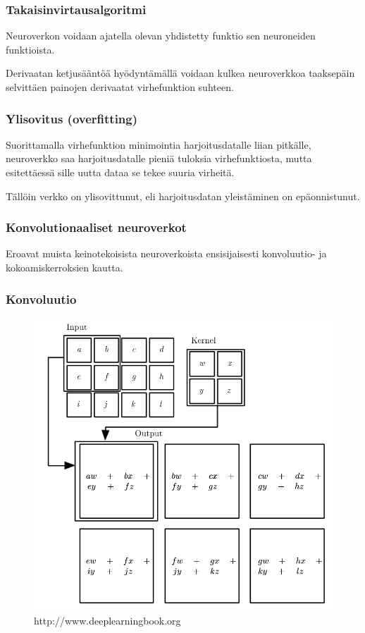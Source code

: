 \documentclass{beamer}
\begin{document}
\begin{frame}
    \frametitle{Takaisinvirtausalgoritmi}
    Neuroverkon voidaan ajatella olevan yhdistetty funktio sen neuroneiden funktioista.

    Derivaatan ketjusääntöä hyödyntämällä voidaan kulkea neuroverkkoa taaksepäin selvittäen
    painojen derivaatat virhefunktion suhteen.
\end{frame}

\begin{frame}
    \frametitle{Ylisovitus (overfitting)}
    Suorittamalla virhefunktion minimointia harjoitusdatalle liian pitkälle,
    neuroverkko saa harjoitusdatalle pieniä tuloksia virhefunktiosta, mutta esitettäessä sille
    uutta dataa se tekee suuria virheitä.

    Tällöin verkko on ylisovittunut, eli harjoitusdatan yleistäminen on epäonnistunut.
\end{frame}

\begin{frame}
    \frametitle{Konvolutionaaliset neuroverkot}
    Eroavat muista keinotekoisista neuroverkoista ensisijaisesti konvoluutio- ja kokoamiskerroksien
    kautta.
\end{frame}

\begin{frame}
    \frametitle{Konvoluutio}
    \begin{figure}[h]
        \label{pic:convolution}
        \centering
        \includegraphics[scale=0.28]{convolution}
        \caption{http://www.deeplearningbook.org}

    \end{figure}
\end{frame}
\end{document}
